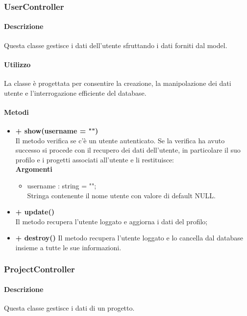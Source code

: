 \subsubsection{UserController}

	\paragraph{Descrizione}
		Questa classe gestisce i dati dell'utente sfruttando i dati forniti dal model.
	\paragraph{Utilizzo}
		La classe è progettata per consentire la creazione, la manipolazione  dei dati utente e l'interrogazione efficiente del database.

	\paragraph{Metodi}
		\begin{itemize}
			\item \textbf{+ show(username = "")}\\
			Il metodo verifica se c'è un utente autenticato. Se la verifica ha avuto successo si procede con il recupero dei dati dell'utente, in particolare il suo profilo e i progetti associati all'utente e li restituisce:\\
			\textbf{Argomenti}
			\begin{itemize}
				\item username : string = "";\\
				Stringa contenente il nome utente con valore di default NULL.
			\end{itemize}
			
			\item \textbf{+ update()}\\
			Il metodo recupera l'utente loggato e aggiorna i dati del profilo;
			
			\item \textbf{+ destroy()}
			Il metodo recupera l'utente loggato e lo cancella dal database insieme a tutte le  sue informazioni.
		\end{itemize}
		
\newpage
\subsubsection{ProjectController}

	\paragraph{Descrizione}
		Questa classe gestisce i dati di un progetto.
